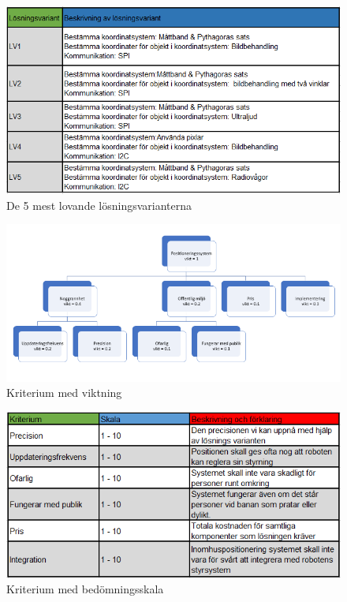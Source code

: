 \documentclass[11pt, a4paper]{report}
\begin{document}
\begin{figure}[H]
	\begin{center}
		\includegraphics [width=12cm,angle=0]{5koncept.png}
		\caption{De 5 mest lovande lösningsvarianterna }
		\label{fig:5koncept}
	\end{center}
\end{figure}


\begin{figure}[H]
	\begin{center}
		\includegraphics [width=12cm,angle=0]{kriteriumvikt.png}
		\caption{Kriterium med viktning }
		\label{fig:kriteriumvikt}
	\end{center}
\end{figure}

\begin{figure}[H]
	\begin{center}
		\includegraphics [width=12cm,angle=0]{bedomningskala.png}
		\caption{Kriterium med bedömningsskala }
		\label{fig:bedomningskala}
	\end{center}
\end{figure}
\end{document}
